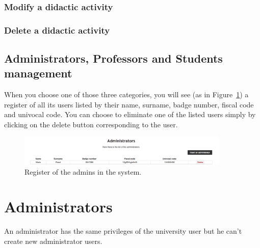 \subsubsection{Modify a didactic activity}
\WarningSubsection
\subsubsection{Delete a didactic activity}
\WarningSubsection

\subsection{Administrators, Professors and Students management}
When you choose one of those three categories, you will see (as in Figure~\ref{fig:adminList}) a register of all its users listed by their 
name, surname, badge number, fiscal code and univocal code. You can choose to eliminate one of the listed users simply by clicking on the delete button corresponding to the user. 
\begin{figure}[!h]
  \centering
  \includegraphics[width=0.90\textwidth]{img/adminList.png}
  \caption{Register of the admins in the system.}
  \label{fig:adminList}
\end{figure}


\section{Administrators}
An administrator has the same privileges of the university user but he can't create new administrator users.





